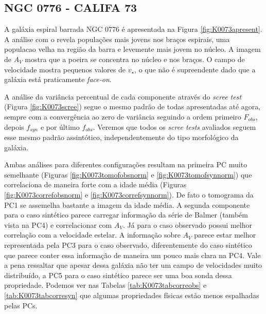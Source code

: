 \subsection{NGC 0776 - CALIFA 73}

A galáxia espiral barrada NGC 0776 é apresentada na Figura \ref{fig:K0073apresent}. A análise com o \starlight revela
populações mais jovens nos braços espirais, uma populacao velha na região da barra e levemente mais jovem no núcleo. A
imagem de $A_V$ mostra que a poeira se concentra no núcleo e nos braços. O campo de velocidade mostra pequenos valores
de $v_\star$, o que não é supreendente dado que a galáxia está praticamente {\em face-on}.

A análise da variância percentual de cada componente através do {\em scree test} (Figura \ref{fig:K0073scree}) segue o
mesmo padrão de todas apresentadas até agora, sempre com a convergência ao zero de variância seguindo a ordem primeiro
$F_{obs}$, depois $f_{syn}$ e por último $f_{obs}$. Veremos que todos os {\em scree tests} avaliados seguem esse mesmo
padrão assintótico, independentemente do tipo morfológico da galáxia.

Ambas análises para diferentes configurações resultam na primeira PC muito semelhante (Figuras
\ref{fig:K0073tomofobsnorm} e \ref{fig:K0073tomofsynnorm}) que correlaciona de maneira forte com a idade média (Figuras
\ref{fig:K0073correfobsnorm} e \ref{fig:K0073correfsynnorm}). De fato o tomograma da PC1 se assemelha bastante a imagem
da idade média. A segunda componente para o caso sintético parece carregar informação da série de Balmer (também vista
na PC4) e correlacionar com $A_V$. Já para o caso observado possui melhor correlação com a velocidade estelar. A
informação sobre $A_V$ parece estar melhor representada pela PC3 para o caso observado, diferentemente do caso sintético
que parece conter essa informação de maneira um pouco mais clara na PC4. Vale a pena ressaltar que apesar dessa galáxia
não ter um campo de velocidades muito distribuído, a PC5 para o caso sintético parece ser uma boa sonda dessa
propriedade. Podemos ver nas Tabelas \ref{tab:K0073tabcorreobs} e \ref{tab:K0073tabcorresyn} que algumas propriedades
físicas estão menos espalhadas pelas PCs.

